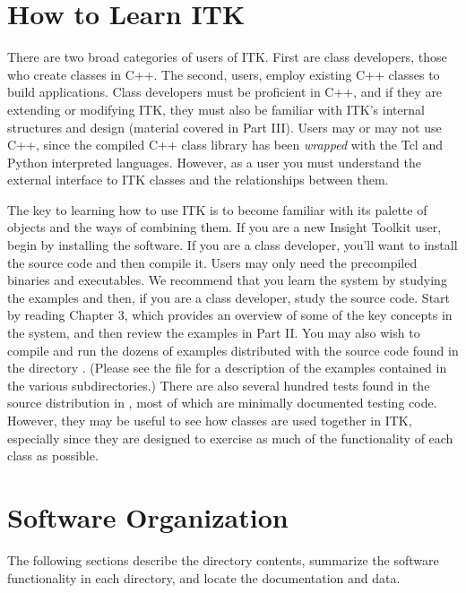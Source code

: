 \section{How to Learn ITK}
\label{sec:HowToLearnITK}

There are two broad categories of users of ITK. First are class
developers, those who create classes in C++. The second, users, employ
existing C++ classes to build applications. Class developers must be
proficient in C++, and if they are extending or modifying ITK, they
must also be familiar with ITK's internal structures and design
(material covered in Part III). Users may or may not use C++, since
the compiled C++ class library has been \emph{wrapped} with the Tcl
and Python interpreted languages. However, as a user you must
understand the external interface to ITK classes and the relationships
between them.

The key to learning how to use ITK is to become familiar with its palette of
objects and the ways of combining them. If you are a new Insight
Toolkit user, begin by installing the software. If you are a class
developer, you'll want to install the source code and then compile it. Users
may only need the precompiled binaries and executables. We recommend that you
learn the system by studying the examples and then, if you are a class
developer, study
the source code. Start by reading Chapter 3,
which provides an overview of some of the key concepts in the system, and
then review the examples in Part II. You may also wish to compile and run the
dozens of examples distributed with the source code found in the directory
. (Please see the file 
 for
a description of the examples contained in the various subdirectories.) There
are also several hundred tests found in the source distribution in 
, most of which are minimally documented
testing code. However, they may be useful to see how classes are used
together in ITK, especially since they are designed to exercise as
much of the functionality of each class as possible.  

\section{Software Organization}
\label{sec:SoftwareOrganization}

The following sections describe the directory contents, summarize the
software functionality in each directory, and locate the documentation and
data.

